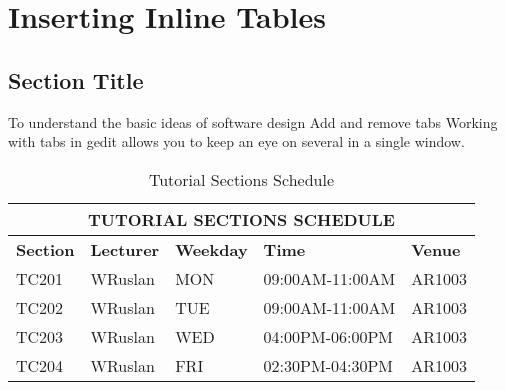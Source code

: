 \chapter{Inserting Inline Tables} 
\label{AppendixB} 


\section{Section Title}
To understand the basic ideas of software design Add and remove tabs Working with tabs in gedit allows you to keep an eye on several  in a single window. 

\begin{table}[ht]
\begin{center}
\begin{tabular}{ |p{1.5cm}|p{2cm}|p{2cm}|p{5cm}|p{1.5cm}| }
\hline \multicolumn{5}{|c|}{\textbf{TUTORIAL SECTIONS SCHEDULE}} \\ [1.0ex]
\hline \textbf{Section} & \textbf{Lecturer} & \textbf{Weekday} & 
\textbf{Time} & \textbf{Venue} \\
\hline TC201 & WRuslan  & MON & 09:00AM-11:00AM  & AR1003  \\ 
\hline TC202 & WRuslan  & TUE & 09:00AM-11:00AM  & AR1003  \\ 
\hline TC203 & WRuslan  & WED & 04:00PM-06:00PM  & AR1003  \\ 
\hline TC204 & WRuslan  & FRI & 02:30PM-04:30PM  & AR1003  \\ 
\hline
\end{tabular}

\caption{Tutorial Sections Schedule}
\label{table:Tutorial-Sections-Schedule}
\end{center}
\end{table}


